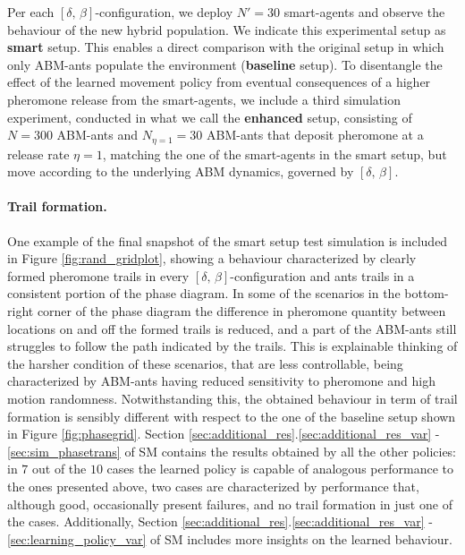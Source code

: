 \documentclass[openacc]{rsproca_new}
\begin{document}
Per each $\left[ \delta, \, \beta \right]$-configuration, we deploy $N' = 30$ smart-agents and observe the behaviour of the new hybrid population. We indicate this experimental setup as \textbf{smart} setup. This enables a direct comparison with the original setup in which only ABM-ants populate the environment (\textbf{baseline} setup). To disentangle the effect of the learned movement policy from eventual consequences of a higher pheromone release from the smart-agents, we include a third simulation experiment, conducted in what we call the \textbf{enhanced} setup, consisting of $N=300$ ABM-ants and $N_{\eta=1} = 30$ ABM-ants that deposit pheromone at a release rate $\eta = 1$, matching the one of the smart-agents in the smart setup, but move according to the underlying ABM dynamics, governed by $\left[ \delta, \, \beta \right]$.

\paragraph{Trail formation.}%
One example of the final snapshot of the smart setup test simulation is included in Figure \ref{fig:rand_gridplot}, showing a behaviour characterized by clearly formed pheromone trails in every $\left[ \delta, \, \beta \right]$-configuration and ants trails in a consistent portion of the phase diagram. In some of the scenarios in the bottom-right corner of the phase diagram the difference in pheromone quantity between locations on and off the formed trails is reduced, and a part of the ABM-ants still struggles to follow the path indicated by the trails. This is explainable thinking of the harsher condition of these scenarios, that are less controllable, being characterized by ABM-ants having reduced sensitivity to pheromone and high motion randomness. Notwithstanding this, the obtained behaviour in term of trail formation is sensibly different with respect to the one of the baseline setup shown in Figure \ref{fig:phasegrid}.
Section \ref{sec:additional_res}.\ref{sec:additional_res_var} - \ref{sec:sim_phasetrans} of SM contains the results obtained by all the other policies: in $7$ out of the $10$ cases the learned policy is capable of analogous performance to the ones presented above, two cases are characterized by performance that, although good, occasionally present failures, and no trail formation in just one of the cases. Additionally, Section \ref{sec:additional_res}.\ref{sec:additional_res_var} - \ref{sec:learning_policy_var} of SM includes more insights on the learned behaviour.
\end{document}
